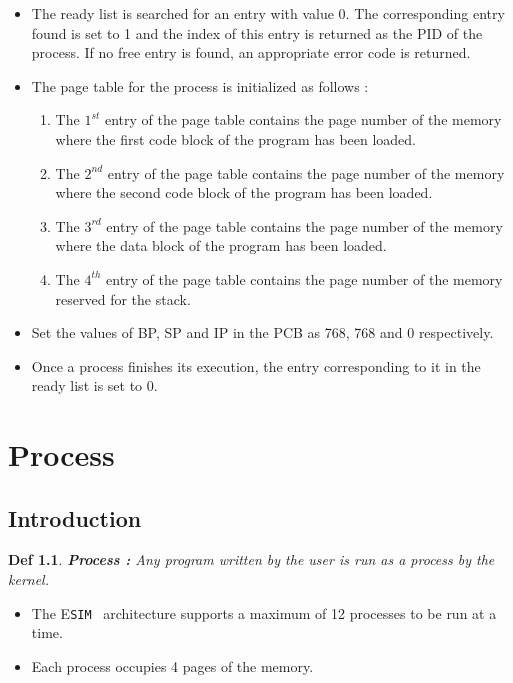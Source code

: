 \documentclass[11pt]{report}
\newtheorem{defn}{Def}
\newcommand{\ESIM}{\textsc{E}\small{\texttt{SIM}}~}
\begin{document}
\begin{itemize}
	\item The ready list is searched for an entry with value 0. The corresponding entry found is set to 1 and the index of this entry is returned as the PID of the process. If no free entry is found, an appropriate error code is returned.
	\item The page table for the process is initialized as follows :
	\begin{enumerate}
		\item The $1^{st}$ entry of the page table contains the page number of the memory where the first code block of the program has been loaded.
		\item The $2^{nd}$ entry of the page table contains the page number of the memory where the second code block of the program has been loaded.
		\item The $3^{rd}$ entry of the page table contains the page number of the memory where the data block of the program has been loaded.
		\item The $4^{th}$ entry of the page table contains the page number of the memory reserved for the stack.
	\end{enumerate}
	\item Set the values of BP, SP and IP in the PCB as 768, 768 and 0 respectively.
	\item Once a process finishes its execution, the entry corresponding to it in the ready list is set to 0.
\end{itemize}


\chapter{Process}
\label{chp:process}

\section{Introduction}
\begin{defn}
	\textbf{Process :} Any program written by the user is run as a process by the kernel. 
\end{defn}
\begin{itemize}
	\item The {\ESIM} architecture supports a maximum of 12 processes to be run at a time.
	\item Each process occupies 4 pages of the memory.
\end{itemize}
\end{document}
